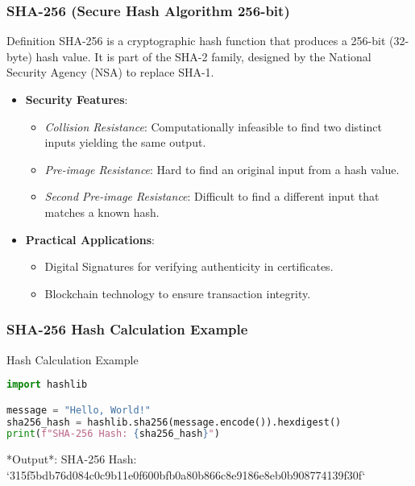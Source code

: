 \documentclass{beamer}
\begin{document}
\begin{frame}[fragile]
    \frametitle{SHA-256 (Secure Hash Algorithm 256-bit)}
    \begin{block}{Definition}
        SHA-256 is a cryptographic hash function that produces a 256-bit (32-byte) hash value. 
        It is part of the SHA-2 family, designed by the National Security Agency (NSA) to replace SHA-1.
    \end{block}

    \begin{itemize}
        \item \textbf{Security Features}:
            \begin{itemize}
                \item \textit{Collision Resistance}: Computationally infeasible to find two distinct inputs yielding the same output.
                \item \textit{Pre-image Resistance}: Hard to find an original input from a hash value.
                \item \textit{Second Pre-image Resistance}: Difficult to find a different input that matches a known hash.
            \end{itemize}
        
        \item \textbf{Practical Applications}:
            \begin{itemize}
                \item Digital Signatures for verifying authenticity in certificates.
                \item Blockchain technology to ensure transaction integrity.
            \end{itemize}
    \end{itemize}

\end{frame}

\begin{frame}[fragile]
    \frametitle{SHA-256 Hash Calculation Example}
    \begin{block}{Hash Calculation Example}
        \begin{lstlisting}[language=Python]
import hashlib

message = "Hello, World!"
sha256_hash = hashlib.sha256(message.encode()).hexdigest()
print(f"SHA-256 Hash: {sha256_hash}")
        \end{lstlisting}
        *Output*: SHA-256 Hash: `315f5bdb76d084c0c9b11e0f600bfb0a80b866c8e9186e8eb0b908774139f30f`
    \end{block}
\end{frame}
\end{document}
